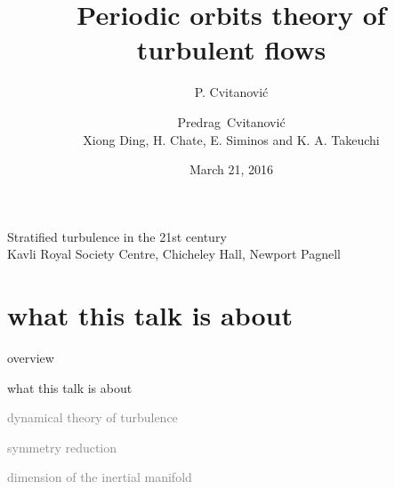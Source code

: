 




\title{\huge Periodic orbits theory of  \\ turbulent flows }
\author{P. Cvitanovi\'c}
\author[Cvitanovi\'c]
{
  \textcolor{green!50!black}{
  {Predrag~Cvitanovi\'c \\
  Xiong Ding, H. Chate, E. Siminos and K. A. Takeuchi
  }	%
  }
}
\institute
{
Stratified turbulence in the 21st century \\
Kavli Royal Society Centre, Chicheley Hall, Newport Pagnell
 }
\date{March 21, 2016}



\begin{frame}
  \titlepage
\end{frame}


\section[what this talk is about]
 {what this talk is about}

\begin{frame}{overview}
\begin{enumerate}
              \item {\Large
what this talk is about
                  }\textcolor{gray}{\small
              \item
dynamical theory of turbulence
              \item
\statesp
              \item
symmetry reduction
              \item
dimension of the inertial manifold
                    }
            \end{enumerate}
\end{frame}



